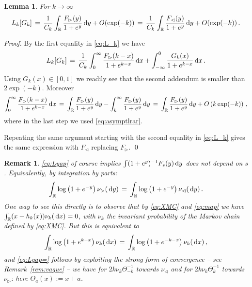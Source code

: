 \documentclass[reqno,11pt]{amsart}
\numberwithin{equation}{section}
\newtheorem{lemma}[theorem]{Lemma}
\newtheorem{rem}[theorem]{Remark}
\newcommand{\dd}{\,\text{\rm d}}             %
\newcommand{\bbR}{{\ensuremath{\mathbb R}} }
\newcommand{\lar}{\vartriangleleft}
\newcommand{\rar}{\vartriangleright}
\begin{document}
\begin{lemma}
\label{th:Lyap}
For $k \to \infty$
\begin{equation}
\label{eq:Lyap}
L_k[G_k]\,=\, \frac 1{C_k}\int_\bbR \frac{F_\rar(y)}{1+e^y} \dd y+ O( \exp(-k))\,=\,   \frac 1{C_k}\int_\bbR \frac{F_\lar(y)}{1+e^y} \dd y+ O( \exp(-k))\,.
\end{equation}
\end{lemma}

\medskip

\noindent
\emph{Proof.} By the first equality in \eqref{eq:L_k} we have
\begin{equation}
\label{eq:for-Lyap-1}
L_k[G_k]\,=\, \frac 1{C_k}\int_0^\infty \frac{F_\rar(k-x)}{1+e^{k-x}} \dd x+
\int_{-\infty}^0 \frac{G_k(x)} {1+e^{k-x}} \dd x\, .
\end{equation}
Using $G_k(x)\in [0, 1]$ we readily see that the second addendum is smaller than $2\exp(-k)$.
Moreover
\begin{equation}
\int_0^\infty \frac{F_\rar(k-x)}{1+e^{k-x}} \dd x\, =\, 
\int_{\bbR} \frac{F_\rar(y)}{1+e^{y}} \dd y - \int_k^\infty \frac{F_\rar(y)}{1+e^{y}} \dd y\, =\, 
\int_{\bbR} \frac{F_\rar(y)}{1+e^{y}} \dd y +O\left(k \exp(-k)\right)
\, ,
\end{equation}
where in the last step we used \eqref{eq:asymptlrar}. 

Repeating the same argument starting with the second equality in \eqref{eq:L_k} gives the same expression with $F_\lar$ replacing $F_\rar$.
\qed

\medskip

\begin{rem}
\label{rem:lyapsim}
\eqref{eq:Lyap} of course implies $\int (1+e^y)^{-1}  F_s(y) \dd y $ does not depend on $s$. Equivalently, by integration by parts:
\begin{equation}
\label{eq:Lyap=}
\int_\bbR \log\left( 1+e^{-y} \right) \nu _\rar (\dd y) \, =\, 
\int_\bbR \log\left( 1+e^{-y} \right) \nu _\lar (\dd y)\,. 
\end{equation}
One way to see this directly is to observe that by \eqref{eq:XMC} and \eqref{eq:map} 
we have $\int_\bbR (x-h_k(x)) \nu_k(\dd x)=0$, with $\nu_k$ the invariant probability of the Markov chain defined by \eqref{eq:XMC}. But this is equivalent to 
\begin{equation}
\int_\bbR \log \left( 1+ e^{k-x} \right) \nu_k(\dd x)\, =\, \int_\bbR \log \left( 1+ e^{-k-x} \right) \nu_k(\dd x)\, ,
\end{equation}
and \eqref{eq:Lyap=} follows by exploiting 
the  strong form of convergence -- see Remark~\ref{rem:vague} -- we have for $2k \nu_k \Theta_{-k}^{-1}$ towards $\nu_\lar$ and for  $2k \nu_k \Theta_k^{-1}$ towards $\nu_\rar$: here $\Theta_a(x):= x+a$. 
\end{rem}
\end{document}
